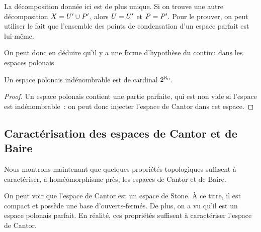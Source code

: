 \begin{remark}
  La décomposition donnée ici est de plus unique. Si on trouve une autre
  décomposition $X = U' \cup P'$, alors $U = U'$ et
  $P = P'$. Pour le prouver, on peut utiliser le fait que l'ensemble
  des points de condensation d'un espace parfait est lui-même.
\end{remark}

On peut donc en déduire qu'il y a une forme d'hypothèse du continu dans les
espaces polonais.

\begin{corollary}
  Un espace polonais indénombrable est de cardinal $2^{\aleph_0}$.
\end{corollary}

\begin{proof}
  Un espace polonais contient une partie parfaite, qui est non vide si l'espace
  est indénombrable~: on peut donc injecter l'espace de Cantor dans cet espace.
\end{proof}

\subsection{Caractérisation des espaces de Cantor et de Baire}

Nous montrons maintenant que quelques propriétés topologiques suffisent à
caractériser, à homéomorphisme près, les espaces de Cantor et de Baire.

On peut voir que l'espace de Cantor est un espace de Stone. \`A ce titre, il est
compact et possède une base d'ouverts-fermés. De plus, on a vu qu'il est un
espace polonais parfait. En réalité, ces propriétés suffisent à caractériser
l'espace de Cantor.

